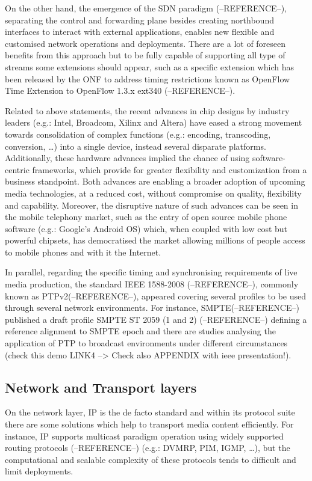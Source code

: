 On the other hand, the emergence of the SDN paradigm (--REFERENCE--), separating the control and forwarding plane besides creating northbound interfaces to interact with external applications, enables new flexible and customised network operations and deployments. There are a lot of foreseen benefits from this approach but to be fully capable of supporting all type of streams some extensions should appear, such as a specific extension which has been released by the ONF to address timing restrictions known as OpenFlow Time Extension to OpenFlow 1.3.x ext340 (--REFERENCE--).



Related to above statements, the recent advances in chip designs by industry leaders (e.g.: Intel, Broadcom, Xilinx and Altera) have eased a strong movement towards consolidation of complex functions (e.g.: encoding, transcoding, conversion, \ldots ) into a single device, instead
several disparate platforms. Additionally, these hardware advances implied the chance of using software-centric frameworks, which provide for greater flexibility and customization from a business standpoint. Both advances are enabling a broader adoption of upcoming media technologies, at a reduced cost, without compromise on quality, flexibility and capability. Moreover, the disruptive nature of such advances can be seen in the mobile telephony market, such as the entry of open source mobile phone software (e.g.: Google’s Android OS) which, when coupled with low cost but powerful chipsets, has democratised the market allowing millions of people access to mobile phones and with it the Internet.

In parallel, regarding the specific timing and synchronising requirements of live media production, the standard IEEE 1588-2008 (--REFERENCE--), commonly known as PTPv2(--REFERENCE--), appeared covering several profiles to be used through several network environments. For instance, SMPTE(--REFERENCE--) published a draft profile SMPTE ST 2059 (1 and 2) (--REFERENCE--) defining a reference alignment to SMPTE epoch and there are studies analysing the application of PTP to broadcast environments under different circumstances (check this demo LINK4 --> Check also APPENDIX with ieee presentation!).

\subsection{Network and Transport layers}

On the network layer, IP is the de facto standard and within its protocol suite there are some solutions which help to transport media content efficiently. For instance, IP supports multicast paradigm operation using widely supported routing protocols (--REFERENCE--) (e.g.: DVMRP, PIM, IGMP, \ldots), but the computational and scalable complexity of these protocols tends to difficult and limit deployments.

